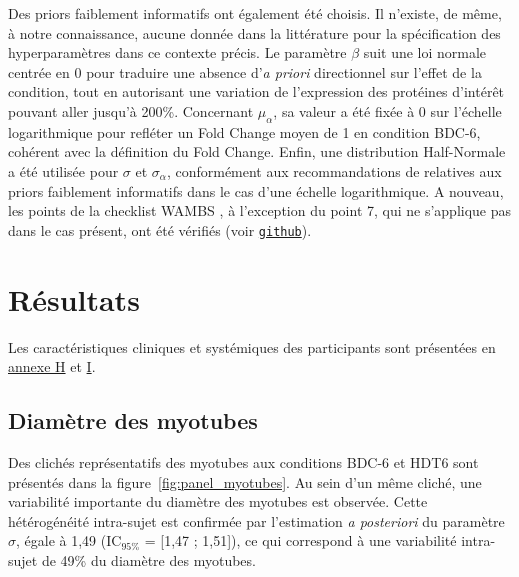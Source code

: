 \documentclass[11pt]{report}
\begin{document}
Des priors faiblement informatifs ont également été choisis. Il n'existe, de même, à notre connaissance, aucune donnée dans la littérature pour la spécification des hyperparamètres dans ce contexte précis. Le paramètre $\beta$ suit une loi normale centrée en 0 pour traduire une absence d'\textit{a priori} directionnel sur l'effet de la condition, tout en autorisant une variation de l'expression des protéines d'intérêt pouvant aller jusqu'à 200\%. Concernant $\mu_{\alpha}$, sa valeur a été fixée à 0 sur l'échelle logarithmique pour refléter un Fold Change moyen de 1 en condition BDC-6, cohérent avec la définition du Fold Change. Enfin, une distribution Half-Normale a été utilisée pour $\sigma$  et $\sigma_{\alpha}$, conformément aux recommandations de \textcite{Gelman2020Aug} relatives aux priors faiblement informatifs dans le cas d'une échelle logarithmique. A nouveau, les points de la checklist WAMBS \parencite{Depaoli2017Jun}, à l'exception du point 7, qui ne s'applique pas dans le cas présent, ont été vérifiés (voir \href{https://github.com/leoninerouanet/memoire_2A_env_systemique}{\texttt{github}}).

\newpage

\chapter{Résultats}
\label{subsec:result}

Les caractéristiques cliniques et systémiques des participants sont présentées en \hyperref[annexeH]{annexe H} et \hyperref[annexeI]{I}.

\section{Diamètre des myotubes}

Des clichés représentatifs des myotubes aux conditions BDC-6 et HDT6 sont présentés dans la figure~\ref{fig:panel_myotubes}. Au sein d'un même cliché, une variabilité importante du diamètre des myotubes est observée. Cette hétérogénéité intra-sujet est confirmée par l'estimation \textit{a posteriori} du paramètre $\sigma$, égale à 1,49 (IC$_{95\%}$ = [1,47 ; 1,51]), ce qui correspond à une variabilité intra-sujet de 49\% du diamètre des myotubes.
\end{document}

